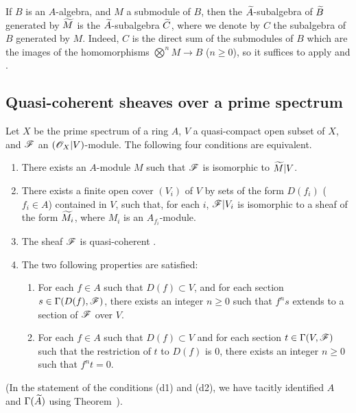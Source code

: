\begin{env}[1.3.14]
\label{1.1.3.14}
If $B$ is an $A$-algebra, and $M$ a submodule of $B$, then the ${\widetilde{A}}$-subalgebra of ${\widetilde{B}}$ generated by ${\widetilde{M}}$  is the ${\widetilde{A}}$-subalgebra ${\widetilde{C}}$, where we denote by $C$ the subalgebra of $B$ generated by $M$.
Indeed, $C$ is the direct sum of the submodules of $B$ which are the images of the homomorphisms $\bigotimes^n M\to B$ ($n\geq 0$), so it suffices to apply  and .
\end{env}

\subsection{Quasi-coherent sheaves over a prime spectrum}
\label{subsection:qcoh-sheaves-over-spec}

\begin{thm}[1.4.1]
\label{1.1.4.1}
Let $X$ be the prime spectrum of a ring $A$, $V$ a quasi-compact open subset of $X$, and $\mathscr{F}$ an $(\mathscr{O}_X|V)$-module.
The following four conditions are equivalent.
\begin{enumerate}[label=\emph{(\alph*)}]
  \item There exists an $A$-module $M$ such that $\mathscr{F}$ is isomorphic to ${\widetilde{M}}|V$.
  \item There exists a finite open cover $(V_i)$ of $V$ by sets of the form $D(f_i)$ ($f_i\in A$) contained in $V$, such that, for each $i$, $\mathscr{F}|V_i$ is isomorphic to a sheaf of the form ${\widetilde{M_i}}$, where $M_i$ is an $A_{f_i}$-module.
  \item The sheaf $\mathscr{F}$ is quasi-coherent .
  \item The two following properties are satisfied:
    \begin{enumerate}[label=\emph{(d\arabic*)}]
      \item For each $f\in A$ such that $D(f)\subset V$, and for each section $s\in\Gamma(D(f),\mathscr{F})$, there exists an integer $n\geq 0$ such that $f^n s$ extends to a section of $\mathscr{F}$ over $V$.
      \item For each $f\in A$ such that $D(f)\subset V$ and for each section $t\in\Gamma(V,\mathscr{F})$ such that the restriction of $t$ to $D(f)$ is $0$, there exists an integer $n\geq 0$ such that $f^n t=0$.
    \end{enumerate}
\end{enumerate}
\end{thm}
(In the statement of the conditions (d1) and (d2), we have tacitly identified $A$ and $\Gamma({\widetilde{A}})$ using Theorem~).

